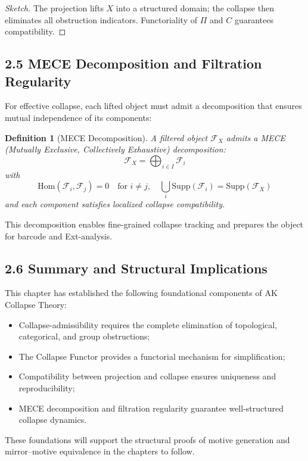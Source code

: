 \documentclass[11pt]{article}
\newtheorem{definition}[theorem]{Definition}
\begin{document}
\begin{proof}[Sketch]
The projection lifts $X$ into a structured domain; the collapse then eliminates all obstruction indicators. Functoriality of $\Pi$ and $C$ guarantees compatibility.
\end{proof}

\subsection{2.5 MECE Decomposition and Filtration Regularity}

For effective collapse, each lifted object must admit a decomposition that ensures mutual independence of its components:

\begin{definition}[MECE Decomposition]
A filtered object $\mathcal{F}_X$ admits a MECE (Mutually Exclusive, Collectively Exhaustive) decomposition:
\[
\mathcal{F}_X = \bigoplus_{i \in I} \mathcal{F}_i
\]
with
\[
\mathrm{Hom}(\mathcal{F}_i, \mathcal{F}_j) = 0 \quad \text{for } i \neq j, \quad \bigcup_i \mathrm{Supp}(\mathcal{F}_i) = \mathrm{Supp}(\mathcal{F}_X)
\]
and each component satisfies localized collapse compatibility.
\end{definition}

This decomposition enables fine-grained collapse tracking and prepares the object for barcode and Ext-analysis.

\subsection{2.6 Summary and Structural Implications}

This chapter has established the following foundational components of AK Collapse Theory:

\begin{itemize}
    \item Collapse-admissibility requires the complete elimination of topological, categorical, and group obstructions;
    \item The Collapse Functor provides a functorial mechanism for simplification;
    \item Compatibility between projection and collapse ensures uniqueness and reproducibility;
    \item MECE decomposition and filtration regularity guarantee well-structured collapse dynamics.
\end{itemize}

These foundations will support the structural proofs of motive generation and mirror–motive equivalence in the chapters to follow.
\end{document}
